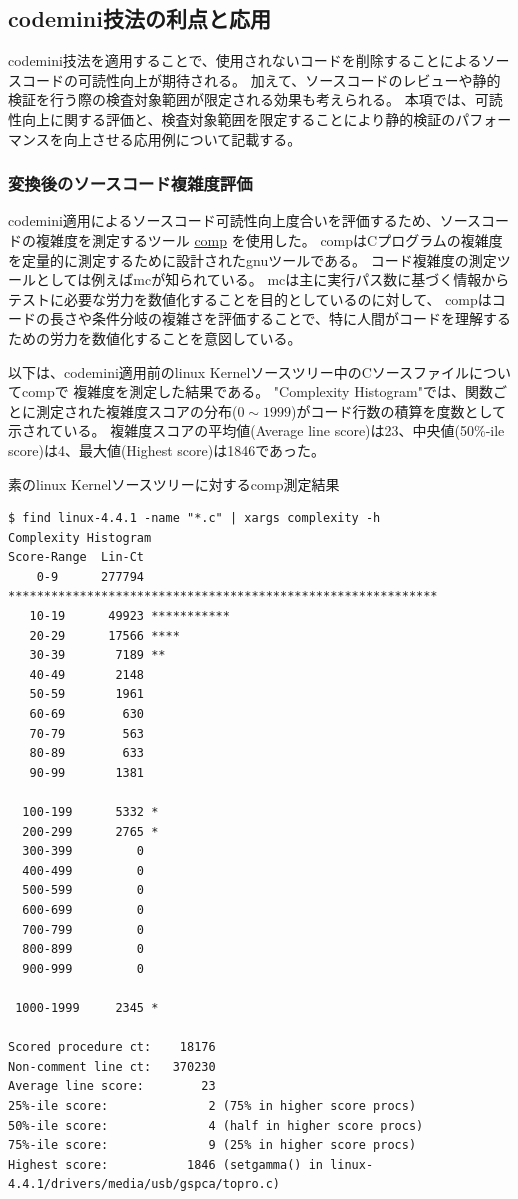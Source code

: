 \subsection{\acrshort{codemini}技法の利点と応用}
\acrshort{codemini}技法を適用することで、使用されないコードを削除することによるソースコードの可読性向上が期待される。
加えて、ソースコードのレビューや静的検証を行う際の検査対象範囲が限定される効果も考えられる。
本項では、可読性向上に関する評価と、検査対象範囲を限定することにより静的検証のパフォーマンスを向上させる応用例について記載する。
\subsubsection{変換後のソースコード複雑度評価}
\acrshort{codemini}適用によるソースコード可読性向上度合いを評価するため、ソースコードの複雑度を測定するツール
\href{https://www.gnu.org/software/complexity/manual/complexity.html}{\acrshort{comp}} \cite{comp}
を使用した。
\acrshort{comp}はCプログラムの複雑度を定量的に測定するために設計された\acrshort{gnu}ツールである。
コード複雑度の測定ツールとしては例えば\acrshort{mc}が知られている。
\acrshort{mc}は主に実行パス数に基づく情報からテストに必要な労力を数値化することを目的としているのに対して、
\acrshort{comp}はコードの長さや条件分岐の複雑さを評価することで、特に人間がコードを理解するための労力を数値化することを意図している。
\par
以下は、\acrshort{codemini}適用前の\acrshort{linux} Kernelソースツリー中のCソースファイルについて\acrshort{comp}で
複雑度を測定した結果である。
"Complexity Histogram"では、関数ごとに測定された複雑度スコアの分布($0 \sim 1999$)がコード行数の積算を度数として示されている。
複雑度スコアの平均値(Average line score)は23、中央値(50\%-ile score)は4、最大値(Highest score)は1846であった。
\begin{itembox}[l]{素の\acrshort{linux} Kernelソースツリーに対する\acrshort{comp}測定結果}
\small
\begin{verbatim}
$ find linux-4.4.1 -name "*.c" | xargs complexity -h
Complexity Histogram
Score-Range  Lin-Ct
    0-9      277794 ************************************************************
   10-19      49923 ***********
   20-29      17566 ****
   30-39       7189 **
   40-49       2148
   50-59       1961
   60-69        630
   70-79        563
   80-89        633
   90-99       1381

  100-199      5332 *
  200-299      2765 *
  300-399         0
  400-499         0
  500-599         0
  600-699         0
  700-799         0
  800-899         0
  900-999         0

 1000-1999     2345 *

Scored procedure ct:    18176
Non-comment line ct:   370230
Average line score:        23
25%-ile score:              2 (75% in higher score procs)
50%-ile score:              4 (half in higher score procs)
75%-ile score:              9 (25% in higher score procs)
Highest score:           1846 (setgamma() in linux-4.4.1/drivers/media/usb/gspca/topro.c)
\end{verbatim}
\end{itembox}
